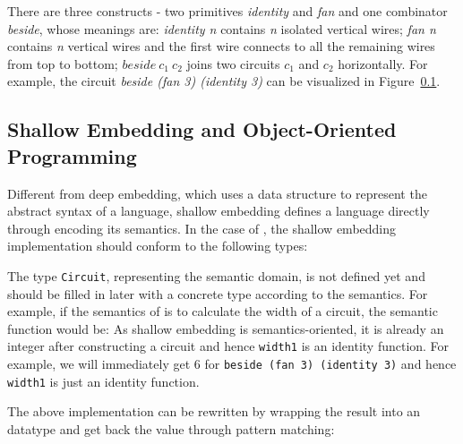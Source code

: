 
There are three constructs - two primitives
\emph{identity} and \emph{fan} and one combinator \emph{beside}, whose
meanings are: \emph{identity n} contains \emph{n} isolated vertical wires;
\emph{fan n} contains \emph{n} vertical wires and the first wire connects to
all the remaining wires from top to bottom; $beside\ c_1\ c_2$ joins two circuits
$c_1$ and $c_2$ horizontally.
For example, the circuit \emph{beside (fan 3) (identity 3)} can be visualized in Figure~\ref{}.

\subsection{Shallow Embedding and Object-Oriented Programming}
Different from deep embedding, which uses a data structure to represent the
abstract syntax of a language, shallow embedding defines a language
directly through encoding its semantics. In the case of \dsl,
the shallow embedding implementation should conform to the following types:

The type \texttt{Circuit}, representing the semantic domain, is not defined yet
and should be filled in later with a concrete type according to the semantics.
For example, if the semantics of \dsl is to calculate the width of a
circuit, the semantic function would be:
As shallow embedding is semantics-oriented, it is already an integer after
constructing a circuit and hence \texttt{width1} is an identity function.
For example, we will immediately get $6$ for
\texttt{beside (fan 3) (identity 3)} and hence \texttt{width1} is just an identity function.

The above implementation can be rewritten by wrapping the result into an
datatype and get back the value through pattern matching:

